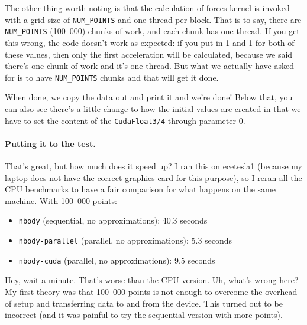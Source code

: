 \documentclass[a4paper]{report}
\begin{document}
The other thing worth noting is that the calculation of forces kernel is invoked with a grid size of \texttt{NUM\_POINTS} and one thread per block. That is to say, there are \texttt{NUM\_POINTS} (100~000) chunks of work, and each chunk has one thread. If you get this wrong, the code doesn't work as expected: if you put in 1 and 1 for both of these values, then only the first acceleration will be calculated, because we said there's one chunk of work and it's one thread. But what we actually have asked for is to have \texttt{NUM\_POINTS} chunks and that will get it done.

When done, we copy the data out and print it and we're done! Below that, you can also see there's a little change to how the initial values are created in that we have to set the content of the \texttt{CudaFloat3/4} through parameter 0. 

\paragraph{Putting it to the test.}
That's great, but how much does it speed up? I ran this on ecetesla1 (because my laptop does not have the correct graphics card for this purpose), so I reran all the CPU benchmarks to have a fair comparison for what happens on the same machine. With 100~000 points:
\begin{itemize}
	\item \texttt{nbody} (sequential, no approximations): 40.3 seconds\vspace{-1em}
	\item \texttt{nbody-parallel} (parallel, no approximations): 5.3 seconds\vspace{-1em}
	\item \texttt{nbody-cuda} (parallel, no approximations): 9.5 seconds
\end{itemize}

Hey, wait a minute. That's worse than the CPU version. Uh, what's wrong here? My first theory was that 100~000 points is not enough to overcome the overhead of setup and transferring data to and from the device. This turned out to be incorrect (and it was painful to try the sequential version with more points). 
\end{document}
